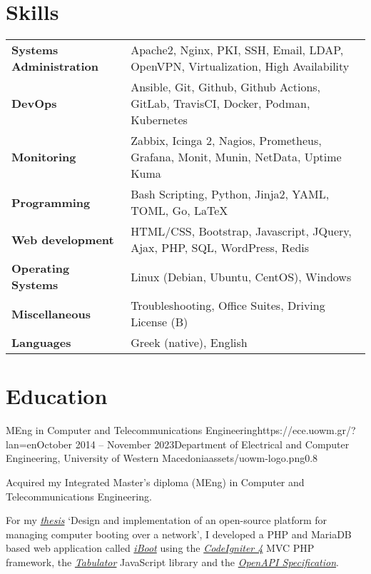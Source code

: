 \documentclass{mycv}
\begin{document}
	\section{Skills}
	\begin{tabular}{m{4.5cm} m{12.5cm}}
		\textbf{Systems Administration}	& Apache2, Nginx, PKI, SSH, Email, LDAP, OpenVPN, Virtualization, High Availability \\
		\textbf{DevOps}	                & Ansible, Git, Github, Github Actions, GitLab, TravisCI, Docker, Podman, Kubernetes \\
		\textbf{Monitoring}             & Zabbix, Icinga 2, Nagios, Prometheus, Grafana, Monit, Munin, NetData, Uptime Kuma \\
		\textbf{Programming} 	 	   	& Bash Scripting, Python, Jinja2, YAML, TOML, Go, \LaTeX \\
		\textbf{Web development}	   	& HTML/CSS, Bootstrap, Javascript, JQuery, Ajax, PHP, SQL, WordPress, Redis \\
		\textbf{Operating Systems}   	& Linux (Debian, Ubuntu, CentOS), Windows \\
		\textbf{Miscellaneous}         	& Troubleshooting, Office Suites, Driving License (B) \\
		\textbf{Languages} 			   	& Greek (native), English 
	\end{tabular}

	\section{Education}

	\begin{EntryDatedLogo}{MEng in Computer and Telecommunications Engineering}{https://ece.uowm.gr/?lan=en}{October 2014 -- November 2023}{Department of Electrical and Computer Engineering, University of Western Macedonia}{assets/uowm-logo.png}{0.8}
		\begin{Itemize}
			\item Acquired my Integrated Master’s diploma (MEng) in Computer and Telecommunications Engineering.
			\item For my \href{https://github.com/ChrisKar96/Thesis}{\textit{thesis}} `Design and implementation of an open-source platform for managing computer booting over a network', I developed a PHP and MariaDB based web application called \href{https://github.com/ChrisKar96/iBoot-Thesis}{\textit{iBoot}} using the \href{https://codeigniter.com/}{\textit{CodeIgniter 4}} MVC PHP framework, the \href{https://tabulator.info/}{\textit{Tabulator}} JavaScript library and the \href{https://swagger.io/specification/}{\textit{OpenAPI Specification}}.
   \end{Itemize}
	\end{EntryDatedLogo}
\end{document}
